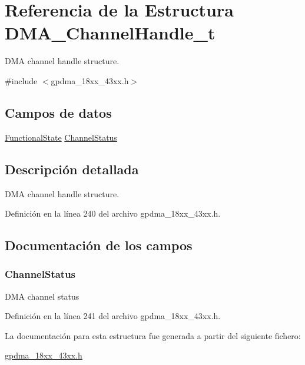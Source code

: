 \hypertarget{struct_d_m_a___channel_handle__t}{}\section{Referencia de la Estructura D\+M\+A\+\_\+\+Channel\+Handle\+\_\+t}
\label{struct_d_m_a___channel_handle__t}


D\+MA channel handle structure.  




{\ttfamily \#include $<$gpdma\+\_\+18xx\+\_\+43xx.\+h$>$}

\subsection*{Campos de datos}
\begin{DoxyCompactItemize}
\item 
\hyperlink{group___l_p_c___types___public___types_gac9a7e9a35d2513ec15c3b537aaa4fba1}{Functional\+State} \hyperlink{struct_d_m_a___channel_handle__t_ab78ef30340620edbe6f1ab2c8d1c298b}{Channel\+Status}
\end{DoxyCompactItemize}


\subsection{Descripción detallada}
D\+MA channel handle structure. 

Definición en la línea 240 del archivo gpdma\+\_\+18xx\+\_\+43xx.\+h.



\subsection{Documentación de los campos}
\subsubsection[{\texorpdfstring{Channel\+Status}{ChannelStatus}}]{ Channel\+Status}\hypertarget{struct_d_m_a___channel_handle__t_ab78ef30340620edbe6f1ab2c8d1c298b}{}\label{struct_d_m_a___channel_handle__t_ab78ef30340620edbe6f1ab2c8d1c298b}
D\+MA channel status 

Definición en la línea 241 del archivo gpdma\+\_\+18xx\+\_\+43xx.\+h.



La documentación para esta estructura fue generada a partir del siguiente fichero\+:\begin{DoxyCompactItemize}
\item 
\hyperlink{gpdma__18xx__43xx_8h}{gpdma\+\_\+18xx\+\_\+43xx.\+h}\end{DoxyCompactItemize}
